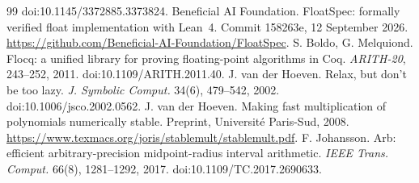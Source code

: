 \documentclass[conference]{IEEEtran}
\theoremstyle{definition}
\theoremstyle{remark}
\begin{document}
\begin{thebibliography}{99}
doi:10.1145/3372885.3373824.
 Beneficial AI Foundation. FloatSpec: formally verified float implementation with Lean~4. Commit
158263e, 12 September 2026. \url{https://github.com/Beneficial-AI-Foundation/FloatSpec}.
 S. Boldo, G. Melquiond. Flocq: a unified library for proving floating-point algorithms in Coq.
\emph{ARITH-20}, 243--252, 2011. doi:10.1109/ARITH.2011.40.
 J. van der Hoeven. Relax, but don't be too lazy. \emph{J. Symbolic Comput.} 34(6),
479--542, 2002. doi:10.1006/jsco.2002.0562.
 J. van der Hoeven. Making fast multiplication of polynomials numerically stable. Preprint, Universit\'e
Paris-Sud, 2008. \url{https://www.texmacs.org/joris/stablemult/stablemult.pdf}.
 F. Johansson. Arb: efficient arbitrary-precision midpoint-radius interval arithmetic. \emph{IEEE
Trans. Comput.} 66(8), 1281--1292, 2017. doi:10.1109/TC.2017.2690633.
\end{thebibliography}
\end{document}
